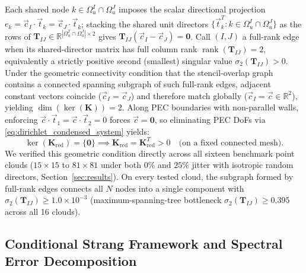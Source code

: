 \documentclass[VANCOUVER]{USG}
\begin{document}
\begin{itemize}
          Each shared node $k \in \Omega_u^I \cap \Omega_u^J$ imposes the scalar directional projection $e_k = \vec{c}_I \cdot \vec{t}_k = \vec{c}_J \cdot \vec{t}_k$; stacking the shared unit directors $\{\vec{t}_k^T : k \in \Omega_u^I \cap \Omega_u^J\}$ as the rows of $\mathbf{T}_{IJ} \in \mathbb{R}^{|\Omega_u^I \cap \Omega_u^J| \times 2}$ gives $\mathbf{T}_{IJ}(\vec{c}_I - \vec{c}_J) = \mathbf{0}$. Call $(I, J)$ a full-rank edge when its shared-director matrix has full column rank $\operatorname{rank}(\mathbf{T}_{IJ}) = 2$, equivalently a strictly positive second (smallest) singular value $\sigma_2(\mathbf{T}_{IJ}) > 0$. Under the geometric connectivity condition that the stencil-overlap graph contains a connected spanning subgraph of such full-rank edges, adjacent constant vectors coincide ($\vec{c}_I = \vec{c}_J$) and therefore match globally ($\vec{c}_I = \vec{c} \in \mathbb{R}^2$), yielding $\dim(\ker(\mathbf{K})) = 2$. Along PEC boundaries with non-parallel walls, enforcing $\vec{c} \cdot \vec{t}_1 = \vec{c} \cdot \vec{t}_2 = 0$ forces $\vec{c} = \mathbf{0}$, so eliminating PEC DoFs via \eqref{eq:dirichlet_condensed_system} yields:
          \begin{equation}
              \ker(\mathbf{K}_{\mathrm{red}}) = \{ \mathbf{0} \} \implies \mathbf{K}_{\mathrm{red}} = \mathbf{K}_{\mathrm{red}}^T > 0 \quad \text{(on a fixed connected mesh)}.
              \label{eq:condensed_positive_definite_proof}
          \end{equation}
          We verified this geometric condition directly across all sixteen benchmark point clouds ($15\times 15$ to $81\times 81$ under both $0\%$ and $25\%$ jitter with isotropic random directors, Section~\ref{sec:results}). On every tested cloud, the subgraph formed by full-rank edges connects all $N$ nodes into a single component with $\sigma_2(\mathbf{T}_{IJ}) \ge 1.0 \times 10^{-3}$ (maximum-spanning-tree bottleneck $\sigma_2(\mathbf{T}_{IJ}) \ge 0.395$ across all 16 clouds).
\end{itemize}

\subsection{Conditional Strang Framework and Spectral Error Decomposition}
\label{subsubsec:strang_framework}
\end{document}
